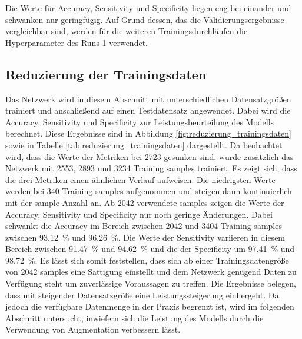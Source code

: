 Die Werte für Accuracy, Sensitivity und Specificity liegen eng bei einander und schwanken nur geringfügig.
Auf Grund dessen, das die Validierungsergebnisse vergleichbar sind, werden für die weiteren Trainingsdurchläufen die Hyperparameter des Runs 1 verwendet. 

\subsection{Reduzierung der Trainingsdaten}
Das Netzwerk wird in diesem Abschnitt mit unterschiedlichen Datensatzgrößen trainiert und anschließend auf einen Testdatensatz angewendet.
Dabei wird die Accuracy, Sensitivity und Specificity zur Leistungsbeurteilung des Modells berechnet.
Diese Ergebnisse sind in Abbildung \ref{fig:reduzierung_trainingsdaten} sowie in Tabelle \ref{tab:reduzierung_trainingsdaten} dargestellt.
Da beobachtet wird, dass die Werte der Metriken bei 2723 gesunken sind, wurde zusätzlich das Netzwerk mit 2553, 2893 und 3234 
Training samples trainiert.
Es zeigt sich, dass die drei Metriken einen ähnlichen Verlauf aufweisen.
Die niedrigsten Werte werden bei 340 Training samples aufgenommen und steigen dann kontinuierlich mit der sample Anzahl an.
Ab 2042 verwendete samples zeigen die Werte der Accuracy, Sensitivity und Specificity nur noch geringe Änderungen.
Dabei schwankt die Accuracy im Bereich zwischen 2042 und 3404 Training samples zwischen \SI{93.12}{\%} und \qty{96.26}{\%}. 
Die Werte der Sensitivity variieren in diesem Bereich zwischen \SI{91.47}{\%} und \SI{94,62}{\%} und die der Specificity um \SI{97.41}{\%} und \SI{98.72}{\%}.
Es lässt sich somit feststellen, dass sich ab einer Trainingsdatengröße von 2042 samples eine Sättigung einstellt und dem Netzwerk genügend Daten zu Verfügung steht um zuverlässige Voraussagen zu treffen. 
Die Ergebnisse belegen, dass mit steigender Datensatzgröße eine Leistungssteigerung einhergeht.
Da jedoch die verfügbare Datenmenge in der Praxis begrenzt ist, wird im folgenden Abschnitt untersucht, inwiefern sich die Leistung des Modells durch die Verwendung von Augmentation verbessern lässt. 
